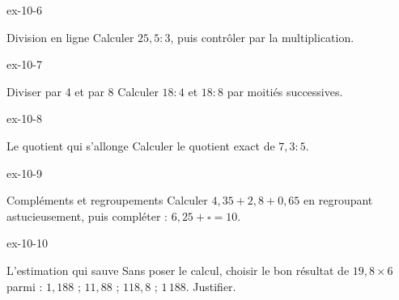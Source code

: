 \begin{blocLivre}{ex-10-6}\begin{exercice}[2]{Division en ligne}
Calculer $25{,}5:3$, puis contrôler par la multiplication.
\end{exercice}\end{blocLivre}
\begin{blocLivre}{ex-10-7}\begin{exercice}[2]{Diviser par 4 et par 8}
Calculer $18:4$ et $18:8$ par moitiés successives.
\end{exercice}\end{blocLivre}
\begin{blocLivre}{ex-10-8}\begin{exercice}[2]{Le quotient qui s’allonge}
Calculer le quotient exact de $7{,}3:5$.
\end{exercice}\end{blocLivre}
\begin{blocLivre}{ex-10-9}\begin{exercice}[2]{Compléments et regroupements}
Calculer $4{,}35+2{,}8+0{,}65$ en regroupant astucieusement, puis compléter : $6{,}25+\square=10$.
\end{exercice}\end{blocLivre}
\begin{blocLivre}{ex-10-10}\begin{exercice}[2]{L’estimation qui sauve}
Sans poser le calcul, choisir le bon résultat de $19{,}8\times6$ parmi : $1{,}188$ ; $11{,}88$ ; $118{,}8$ ; $1\,188$. Justifier.
\end{exercice}\end{blocLivre}

